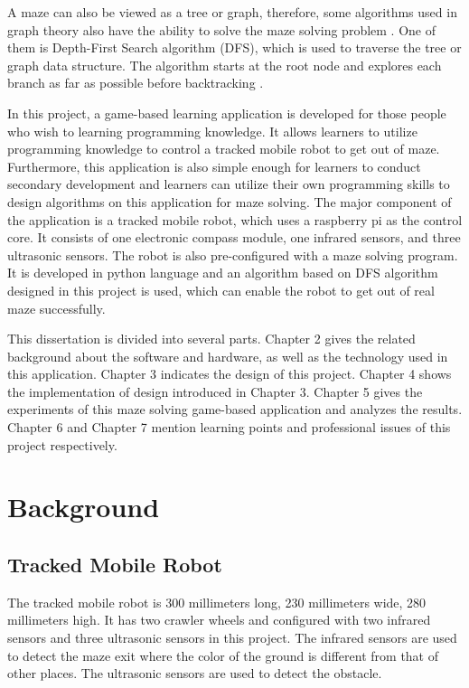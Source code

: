 \documentclass[11pt,times,oneside,openright,hardcopy]{eeereport}
\begin{document}
A maze can also be viewed as a tree or graph, therefore, some algorithms used in graph theory also have the ability to solve the maze solving problem \cite{Tiwari:2012ts}. One of them is Depth-First Search algorithm (DFS), 
which is used to traverse the tree or graph data structure. The algorithm starts at the root node and explores each branch as far as possible before backtracking \cite{Braendeland:2015wf}.

In this project, a game-based learning application is developed for those people who wish to learning programming knowledge. It allows learners to utilize programming knowledge to control a tracked mobile robot to get out of maze. Furthermore, this application is also simple enough for learners to conduct secondary development 
and learners can utilize their own programming skills to design algorithms on this application for maze solving. The major component of the application is a tracked mobile robot, which uses a raspberry pi as the control core. It consists of one electronic compass module, one infrared sensors, and three ultrasonic sensors. 
The robot is also pre-configured with a maze solving program. It is developed in python language and an algorithm based on DFS algorithm designed in this project is used, which can enable the robot to get out of real maze successfully.

This dissertation is divided into several parts. Chapter 2 gives the related background about the software and hardware, as well as the technology used in this application. Chapter 3 indicates the design of this project. Chapter 4 shows the implementation of design introduced in Chapter 3.
Chapter 5 gives the experiments of this maze solving game-based application and analyzes the results. Chapter 6 and Chapter 7 mention learning points and professional issues of this project respectively.


\chapter{Background}\label{cpt:spec}

\section{Tracked Mobile Robot}
The tracked mobile robot is 300 millimeters long, 230 millimeters wide, 280 millimeters high. It has two crawler wheels and configured with two infrared sensors and three ultrasonic sensors in this project.
The infrared sensors are used to detect the maze exit where the color of the ground is different from that of other places.
The ultrasonic sensors are used to detect the obstacle.
\end{document}
